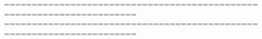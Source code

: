 
======================================================================
======================================================================
